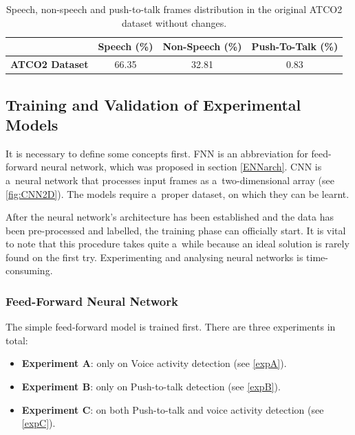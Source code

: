     \begin{table}[!h]
        \begin{center}
        \begin{tabular}{|c|c|c|c|}\hline 
            & \textbf{Speech (\%)} & \textbf{Non-Speech (\%)} & \textbf{Push-To-Talk (\%)} \\ \hline
            \textbf{ATCO2 Dataset} & 66.35 & 32.81 & 0.83 \\ \hline
        \end{tabular}
        \caption{Speech, non-speech and push-to-talk frames distribution in the original ATCO2 dataset without changes.}
        \label{tableATCO2distrib}
        \end{center}
    \end{table}

    \newpage

    \subsection{Training and Validation of Experimental Models}\label{TVEM}

    It is necessary to define some concepts first. FNN is an abbreviation for feed-forward neural network, which was proposed in section \ref{ENNarch}. CNN is a~neural network that processes input frames as a~two-dimensional array (see \ref{fig:CNN2D}). The models require a~proper dataset, on which they can be learnt.

    After the neural network's architecture has been established and the data has been pre-processed and labelled, the training phase can officially start. It is vital to note that this procedure takes quite a~while because an ideal solution is rarely found on the first try. Experimenting and analysing neural networks is time-consuming. 
    
    \subsubsection{Feed-Forward Neural Network}\label{FNNtrainandvalid}

    The simple feed-forward model is trained first. There are three experiments in total:
    \begin{itemize}
        \item \textbf{Experiment A}: only on Voice activity detection (see \ref{expA}).
        \item \textbf{Experiment B}: only on Push-to-talk detection (see \ref{expB}).
        \item \textbf{Experiment C}: on both Push-to-talk and voice activity detection (see \ref{expC}).
    \end{itemize}

